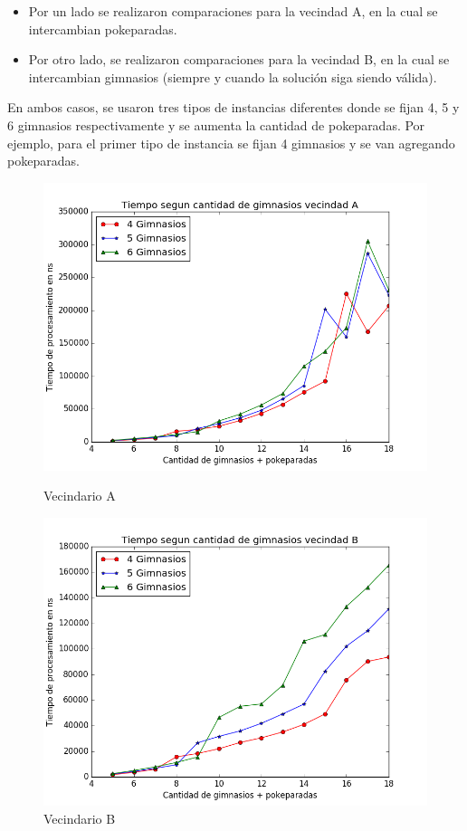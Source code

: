             \begin{itemize}
                \item Por un lado se realizaron comparaciones para la vecindad A, en la cual se intercambian pokeparadas.
 
                \item Por otro lado, se realizaron comparaciones para la vecindad B, en la cual se intercambian gimnasios (siempre y cuando la solución siga siendo válida).
            \end{itemize}
			
			En ambos casos, se usaron tres tipos de instancias diferentes donde se fijan 4, 5 y 6 gimnasios respectivamente y se aumenta la cantidad de pokeparadas. Por ejemplo, para el primer tipo de instancia se fijan 4 gimnasios y se van agregando pokeparadas.

\blindtext

\begin{figure}[H]
  \includegraphics[width=\linewidth]{imagenes/Exp1Ej3a.png}
  \caption{Vecindario A}
\endminipage\hfill
{}%
  \includegraphics[width=\linewidth]{imagenes/Exp1Ej3b.png}
  \caption{Vecindario B}
\endminipage
\end{figure}


